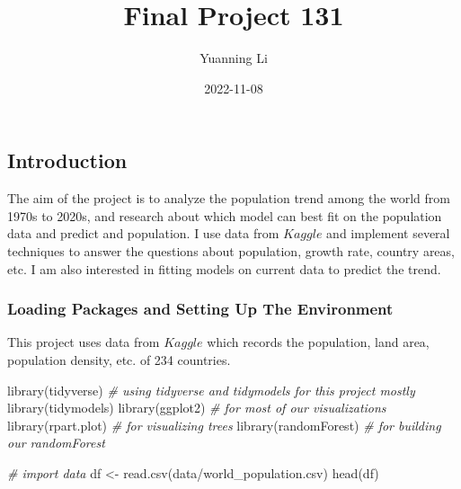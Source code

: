 \documentclass[
]{article}
\title{Final Project 131}
\author{Yuanning Li}
\date{2022-11-08}
\newenvironment{Shaded}{\begin{snugshade}}{\end{snugshade}}
\newcommand{\CommentTok}[1]{\textcolor[rgb]{0.56,0.35,0.01}{\textit{#1}}}
\newcommand{\FunctionTok}[1]{\textcolor[rgb]{0.00,0.00,0.00}{#1}}
\newcommand{\NormalTok}[1]{#1}
\newcommand{\OtherTok}[1]{\textcolor[rgb]{0.56,0.35,0.01}{#1}}
\newcommand{\StringTok}[1]{\textcolor[rgb]{0.31,0.60,0.02}{#1}}
\begin{document}
\maketitle

\hypertarget{introduction}{%
\subsection{Introduction}\label{introduction}}

The aim of the project is to analyze the population trend among the
world from 1970s to 2020s, and research about which model can best fit
on the population data and predict and population. I use data from
\(Kaggle\) and implement several techniques to answer the questions
about population, growth rate, country areas, etc. I am also interested
in fitting models on current data to predict the trend.

\hypertarget{loading-packages-and-setting-up-the-environment}{%
\subsubsection{Loading Packages and Setting Up The
Environment}\label{loading-packages-and-setting-up-the-environment}}

This project uses data from \(Kaggle\) which records the population,
land area, population density, etc. of 234 countries.

\begin{Shaded}
\begin{Highlighting}[]
\FunctionTok{library}\NormalTok{(tidyverse)   }\CommentTok{\# using tidyverse and tidymodels for this project mostly}
\FunctionTok{library}\NormalTok{(tidymodels)}
\FunctionTok{library}\NormalTok{(ggplot2)   }\CommentTok{\# for most of our visualizations}
\FunctionTok{library}\NormalTok{(rpart.plot)  }\CommentTok{\# for visualizing trees}
\FunctionTok{library}\NormalTok{(randomForest)   }\CommentTok{\# for building our randomForest}
\end{Highlighting}
\end{Shaded}

\begin{Shaded}
\begin{Highlighting}[]
\CommentTok{\# import data}
\NormalTok{df }\OtherTok{\textless{}{-}} \FunctionTok{read.csv}\NormalTok{(}\StringTok{\textquotesingle{}data/world\_population.csv\textquotesingle{}}\NormalTok{)}
\FunctionTok{head}\NormalTok{(df)}
\end{Highlighting}
\end{Shaded}
\end{document}
